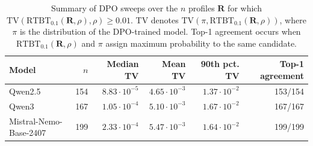 \begin{table}[h!]
\centering
\small
\begin{tabular}{lrrrrr}
\hline
Model & $n$ & Median TV & Mean TV & 90th pct. TV & Top-1 agreement \\
\hline
Qwen2.5 & 154 & $8.83\cdot 10^{-5}$ & $4.65\cdot 10^{-3}$ & $1.37\cdot 10^{-2}$ & 153/154 \\
Qwen3 & 167 & $1.05\cdot 10^{-4}$ & $5.10\cdot 10^{-3}$ & $1.67\cdot 10^{-2}$ & 167/167 \\
Mistral-Nemo-Base-2407 & 199 & $2.33\cdot 10^{-4}$ & $5.47\cdot 10^{-3}$ & $1.64\cdot 10^{-2}$ & 199/199 \\
\hline
\end{tabular}
\vspace{1em}
\caption{Summary of DPO sweeps over the $n$ profiles $\mathbf{R}$ for which $\mathrm{TV}(\mathrm{RTBT}_{0.1}(\mathbf{R},\rho),\rho)\geq 0.01$. TV denotes $\mathrm{TV}(\pi,\mathrm{RTBT}_{0.1}(\mathbf{R},\rho))$, where $\pi$ is the distribution of the DPO-trained model. Top-1 agreement occurs when $\mathrm{RTBT}_{0.1}(\mathbf{R},\rho)$ and $\pi$ assign maximum probability to the same candidate.}
\label{dpo-numerical-summary}
\end{table}
